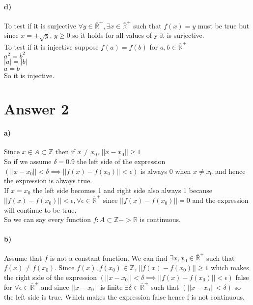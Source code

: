 \documentclass[12pt]{article}
\begin{document}
\paragraph{d)}
To test if it is surjective $\forall y \in \overline{\mathbb{R}}^{+} , \exists x \in \overline{\mathbb{R}}^{+}$ such that $f(x) = y$ must be true but since  $x= \pm \sqrt{y}$, $ y\ge 0$ so it holds for all values of y it is surjective. \\
To test if it is injective suppose $f(a) = f(b)$ for $a,b\in \overline{\mathbb{R}}^{+}$\\
$a^2 = b^2$\\
$|a| = |b|$\\$a=b$\\
So it is injective.



\section*{Answer 2}
\paragraph{a)}
Since $x\in A \subset \mathbb{Z}$ then if $x\neq x_0$, $||x-x_0||\geq 1$\\
So if we assume $\delta = 0.9$ the left side of the expression $(||x -x_0|| < \delta \implies ||f(x) -f(x_0)|| < \epsilon)$ is always 0 when $x\neq x_0$ and hence the expression is always true.\\ 
If $x = x_0$ the left side becomes 1 and right side also always 1 because $||f(x) -f(x_0)|| < \epsilon,\forall \epsilon \in \overline{\mathbb{R}}^{+}$ since $||f(x) -f(x_0)||=0$ and the expression will continue to be true.\\
So we can say every function $f : A\subset \mathbb{Z} -> \mathbb{R}$ is continuous.



\paragraph{b)}
Assume that $f$ is not a constant function. We can find $\exists x,x_0 \in \overline{\mathbb{R}}^{+}$ such that $f(x) \neq f(x_0)$. Since $f(x),f(x_0) \in \mathbb{Z}$, $||f(x) -f(x_0)|| \geq 1$ which makes the right side of the expression $(||x -x_0|| < \delta \implies ||f(x) -f(x_0)|| < \epsilon)$ false for $\forall \epsilon \in \overline{\mathbb{R}}^{+}$ and since $||x -x_0||$  is finite $\exists \delta \in \overline{\mathbb{R}}^{+}$ such that $(||x -x_0|| < \delta)$ so the left side is true.
 Which makes the expression false hence f is not continuous.
\end{document}
